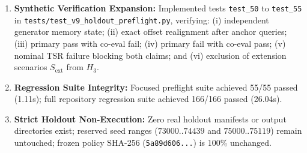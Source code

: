 \documentclass[10pt,a4paper]{article}
\begin{document}
\begin{enumerate}
\begin{itemize}
    \end{itemize}
    \item \textbf{Synthetic Verification Expansion:} Implemented tests \texttt{test\_50} to \texttt{test\_55} in \texttt{tests/test\_v9\_holdout\_preflight.py}, verifying: (i) independent generator memory state; (ii) exact offset realignment after anchor queries; (iii) primary pass with co-eval fail; (iv) primary fail with co-eval pass; (v) nominal TSR failure blocking both claims; and (vi) exclusion of extension scenarios $S_{\mathrm{ext}}$ from $H_3$.
    \item \textbf{Regression Suite Integrity:} Focused preflight suite achieved 55/55 passed (1.11s); full repository regression suite achieved 166/166 passed (26.04s).
    \item \textbf{Strict Holdout Non-Execution:} Zero real holdout manifests or output directories exist; reserved seed ranges ($73000..74439$ and $75000..75119$) remain untouched; frozen policy SHA-256 (\texttt{5a89d606...}) is 100\% unchanged.
\end{enumerate}
\end{document}
